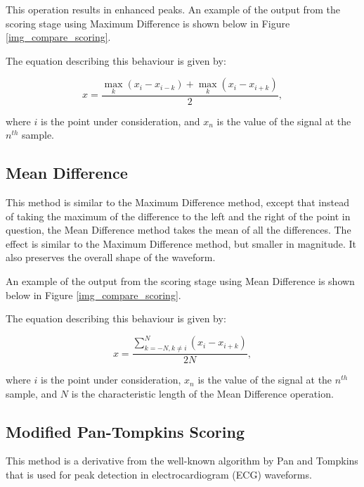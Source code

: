                 This operation results in enhanced peaks. An example of the output from the scoring stage using Maximum Difference is shown below in Figure \ref{img_compare_scoring}.

                The equation describing this behaviour is given by:

                \begin{equation}
                x = \frac{\max\limits_k{(x_i - x_{i-k})} + \max\limits_k{(x_i - x_{i+k})}}{2},
                \end{equation}

                where $i$ is the point under consideration, and $x_n$ is the value of the signal at the $n^{th}$ sample.
              

            \subsection{Mean Difference}

                This method is similar to the Maximum Difference method, except that instead of taking the maximum of the difference to the left and the right of the point in question, the Mean Difference method takes the mean of all the differences. The effect is similar to the Maximum Difference method, but smaller in magnitude. It also preserves the overall shape of the waveform.

                An example of the output from the scoring stage using Mean Difference is shown below in Figure \ref{img_compare_scoring}.

                The equation describing this behaviour is given by:

                \begin{equation}
                x = \frac{\sum_{k=-N, k\neq i}^{N} (x_i - x_{i+k})}{2N},
                \end{equation}

                where $i$ is the point under consideration, $x_n$ is the value of the signal at the $n^{th}$ sample, and $N$ is the characteristic length of the Mean Difference operation.


            \subsection{Modified Pan-Tompkins Scoring}

                This method is a derivative from the well-known algorithm by Pan and Tompkins \cite{pan-tompkins} that is used for peak detection in electrocardiogram (ECG) waveforms. 

